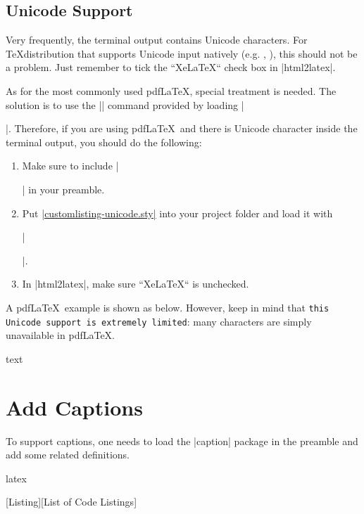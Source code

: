 \documentclass[letterpaper, 11pt, DIV=11]{scrartcl}
\begin{document}
\subsection{Unicode Support}

Very frequently, the terminal output contains Unicode characters. For \TeX distribution that supports Unicode input natively (e.g. \XeLaTeX, \LuaLaTeX), this should not be a problem. Just remember to tick the ``XeLaTeX`` check box in \rawinline|html2latex|.


As for the most commonly used pdf\LaTeX, special treatment is needed. The solution is to use the \texinline|\unichar| command provided by loading \texinline|\usepackage[utf8x]{inputenc}|. Therefore, if you are using pdf\LaTeX\ and there is Unicode character inside the terminal output, you should do the following:

\begin{enumerate}
\item Make sure to include \texinline|\usepackage[utf8x]{inputenc}| in your preamble.
\item Put \href{https://github.com/xziyue/latex-beautiful-listings-screenshot/blob/master/customlisting-unicode.sty}{\rawinline|customlisting-unicode.sty|} into your project folder and load it with 

\texinline|\usepackage{customlisting-unicode}|.
\item In \rawinline|html2latex|, make sure ``XeLaTeX`` is unchecked.
\end{enumerate}

A pdf\LaTeX\ example is shown as below. However, keep in mind that \texttt{this Unicode support is extremely limited}: many characters are simply unavailable in pdf\LaTeX.

\begin{tcbsrccode}{text}

\end{tcbsrccode}



\section{Add Captions}

To support captions, one needs to load the \rawinline|caption| package in the preamble and add some related definitions. 

\begin{tcbsrccode}{latex}
\usepackage{caption}

\newenvironment{mylisting}{\medskip\captionsetup{type=listing, labelsep=space}}{\medskip}
[Listing][List of Code Listings]
\end{tcbsrccode}
\end{document}
